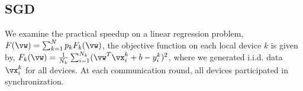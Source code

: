 
\subsection{SGD}
We examine the practical speedup on a linear regression problem, 
$ F(\vw) = \sum_{k=1}^N p_kF_k(\vw)$, the objective function on each local device $k$ is given by, $F_k(\vw) = \frac{1}{N_k} \sum_{i=1}^{N_k} (\vw^T\vx_i^k + b  - y_i^k)^2$, where we generated i.i.d. data $\vx_i^k$ for all devices. At each communication round, all devices participated
in synchronization. 

